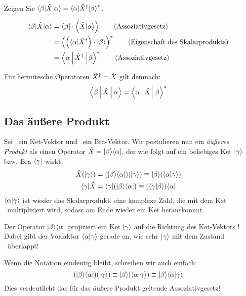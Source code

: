 \begin{aufg} \label{aufg:ccadjmatrixelement}
 Zeigen Sie $\brab\opx\keta = \cc{\braa\opxh\ketb}$.
\end{aufg}
\begin{loes}
 \begin{align}
  \brab\opx\keta &= \brab \cdot \left(\opx\keta\right) \tag{Assoziativgesetz} \\
  &= \cc{\left(\left(\braa\opxh\right) \cdot \ketb \right)} \tag{Eigenschaft des Skalarprodukts} \\
  &= \cc{\Braket{\alpha | \opxh | \beta}} \tag{Assoziativgesetz}
 \end{align}
 \qedsymbol
\end{loes}

\begin{notiz}
 F\"ur hermitesche Operatoren ${\hat{X}}^{\dag} = \hat{X}$ gilt demnach:
 \begin{equation}
  \Braket{\beta | \hat{X} | \alpha} = \Braket{\alpha | \hat{X} | \beta}^*
 \end{equation}

\end{notiz}


\subsection{Das \"au\ss{}ere Produkt}
\begin{post}
 Sei \ketb\ ein Ket-Vektor und \braa\ ein Bra-Vektor. Wir postulieren nun ein \emph{\"au\ss{}eres Produkt} als einen Operator $\opx = \ketb\braa$, der wie folgt auf ein beliebiges Ket $\ket{\gamma}$ bzw. Bra $\bra{\gamma}$ wirkt:
 \begin{align}
  \opx (\ket{\gamma}) &= (\ketb\braa)(\ket{\gamma}) \equiv \ketb (\braket{\alpha|\gamma}) \\
  \bra{\gamma} \opx &= \bra{\gamma} (\ketb\braa) \equiv (\braket{\gamma | \beta}) \braa
 \end{align}
 $\braket{\alpha|\gamma}$ ist wieder das Skalarprodukt, eine komplexe Zahl, die mit dem Ket \ketb\ multipliziert wird, sodass am Ende wieder ein Ket herauskommt.
\end{post}
\begin{notiz}
 Der Operator $\ketb\braa$ projiziert ein Ket $\ket{\gamma}$ auf die Richtung des Ket-Vektors \ketb! Dabei gibt der Vorfaktor $\braket{\alpha|\gamma}$ gerade an, wie sehr $\ket{\gamma}$ mit dem Zustand \keta\ \"uberlappt!
\end{notiz}
\begin{konv}
 Wenn die Notation eindeutig bleibt, schreiben wir auch einfach:
 \begin{equation}
  (\ketb\braa)(\ket{\gamma}) \equiv \ketb (\braket{\alpha|\gamma}) \equiv \ketb\braket{\alpha|\gamma}
 \end{equation}
 Dies verdeutlicht das f\"ur das \"au\ss{}ere Produkt geltende Assoziativgesetz!
\end{konv}

